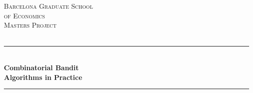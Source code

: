 \begin{titlepage}

\newcommand{\HRule}{\rule{\linewidth}{0.5mm}} %

\center %


\textsc{\LARGE Barcelona Graduate School}\\[0.2cm] %
\textsc{\LARGE of Economics}\\[1.5cm] %
\textsc{\Large Masters Project}\\[0.5cm] %
\textsc{\large }\\[0.5cm] %


\HRule \\[0.4cm]
{ \huge \bfseries Combinatorial Bandit}\\[0.4cm] %
{ \huge \bfseries Algorithms in Practice}\\[0.4cm]
\HRule \\[1.5cm]




\end{titlepage}
